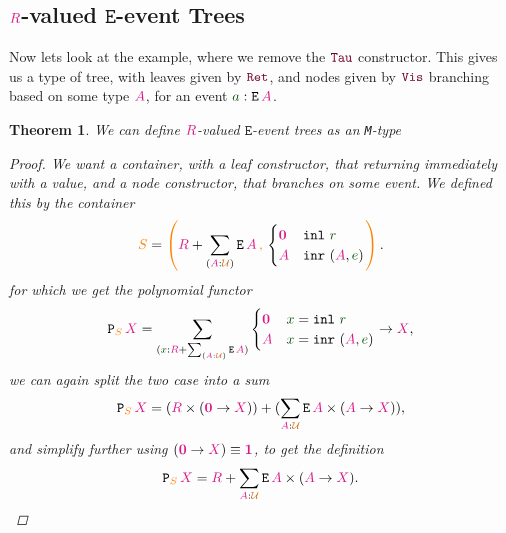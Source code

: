 \documentclass[twoside,11pt,openright]{report}
\theoremstyle{plain} %
\newtheorem{thm}{Theorem}[section]
\theoremstyle{definition}
\theoremstyle{remark}
\newcommand*{\term}[1]{\textcolor{green!30!black}{#1}} %
\newcommand*{\type}[1]{\textcolor{magenta!90!black}{#1}}
\newcommand*{\container}[1]{\textcolor{orange}{#1}}
\newcommand*{\containerpair}[2]{\ensuremath{\colorlet{savedleftcolor}{.}\color{orange}\left(\color{savedleftcolor}#1\,\textcolor{orange}{\mathbf{,}}\,#2\color{orange}\right)\color{savedleftcolor}}}
\newcommand*{\universe}[1]{\textcolor{orange!80!black}{#1}}
\newcommand*{\unit}{\type{\textbf{1}}}
\newcommand*{\empt}{\type{\textbf{0}}}
\newcommand*{\constructor}[1]{\textcolor{purple!60!black}{\ensuremath{\mathtt{#1}}}}
\newcommand*{\typeformer}[1]{\ensuremath{\mathtt{#1}}}
\newcommand*{\functor}[1]{\ensuremath{\mathbf{\mathtt{#1}}}}
\begin{document}
\subsection{\(\type{R}\)-valued \(\typeformer{E}\)-event Trees}
Now lets look at the example, where we remove the \(\constructor{Tau}\) constructor. This gives us a type of tree, with leaves given by \(\constructor{Ret}\), and nodes given by \(\constructor{Vis}\) branching based on some type \(\type{A}\), for an event \(\term{a} : \typeformer{E}\,\type{A}\). 
\begin{thm}
  We can define \(\type{R}\)-valued \(\typeformer{E}\)-event trees as an \texttt{M}-type
  \begin{proof}
    We want a container, with a leaf constructor, that returning immediately with a value, and a node constructor, that branches on some event. We defined this by the container
  \begin{equation}
    \container{S} = \containerpair{\type{R} + \sum_{(\type{A} : \universe{\mathcal{U}})} \typeformer{E}\,\type{A}}{\begin{cases}\empt & \mathtt{inl}~\term{r} \\ \type{A} & \mathtt{inr}~(\type{A},\term{e})\end{cases}}.
  \end{equation}
for which we get the polynomial functor
\begin{equation}
  \functor{P}_{\container{S}}\,\type{X} = \sum_{(\term{x} : \type{R} + \sum_{(\type{A} : \universe{\mathcal{U}})} \typeformer{E}\,\type{A})} \begin{cases}\empt & \term{x} = \mathtt{inl}~\term{r} \\ \type{A} & \term{x} = \mathtt{inr}~(\type{A},\term{e})\end{cases} \rightarrow \type{X},
\end{equation}
we can again split the two case into a sum
\begin{equation}
  \functor{P}_{\container{S}}\,\type{X} = (\type{R} \times (\empt \rightarrow \type{X})) + (\sum_{\type{A} : \universe{\mathcal{U}}} \typeformer{E}\,\type{A} \times (\type{A} \rightarrow \type{X})),
\end{equation}
and simplify further using \((\empt \rightarrow \type{X}) \equiv \unit\), to get the definition
\begin{equation}
  \functor{P}_{\container{S}}\,\type{X} = \type{R} + \sum_{\type{A} : \universe{\mathcal{U}}} \typeformer{E}\,\type{A} \times (\type{A} \rightarrow \type{X}).
\end{equation}

\end{proof}
\end{thm}
\end{document}
